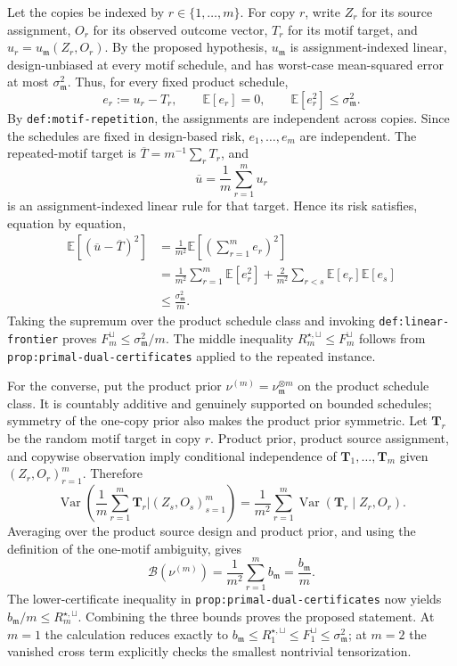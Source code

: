 Let the copies be indexed by \(r\in\{1,\ldots,m\}\).  For copy \(r\), write \(Z_r\) for its source assignment, \(O_r\) for its observed outcome vector, \(T_r\) for its motif target, and \(u_r=u_{\mathfrak m}(Z_r,O_r)\).  By the proposed hypothesis, \(u_{\mathfrak m}\) is assignment-indexed linear, design-unbiased at every motif schedule, and has worst-case mean-squared error at most \(\sigma_{\mathfrak m}^2\).  Thus, for every fixed product schedule,
\[
 e_r:=u_r-T_r,
 \qquad
 \mathbb E[e_r]=0,
 \qquad
 \mathbb E[e_r^2]\le\sigma_{\mathfrak m}^2.
\]
By \texttt{def:motif-repetition}, the assignments are independent across copies.  Since the schedules are fixed in design-based risk, \(e_1,\ldots,e_m\) are independent.  The repeated-motif target is \(\overline T=m^{-1}\sum_rT_r\), and
\[
 \overline u=\frac1m\sum_{r=1}^mu_r
\]
is an assignment-indexed linear rule for that target.  Hence its risk satisfies, equation by equation,
\[
\begin{aligned}
 \mathbb E[(\overline u-\overline T)^2]
 &=\frac1{m^2}\mathbb E\left[\left(\sum_{r=1}^me_r\right)^2\right]\\
 &=\frac1{m^2}\sum_{r=1}^m\mathbb E[e_r^2]
   +\frac2{m^2}\sum_{r<s}\mathbb E[e_r]\mathbb E[e_s]\\
 &\le\frac{\sigma_{\mathfrak m}^2}{m}.
\end{aligned}
\]
Taking the supremum over the product schedule class and invoking \texttt{def:linear-frontier} proves \(F_m^{\sqcup}\le\sigma_{\mathfrak m}^2/m\).  The middle inequality \(R_m^{\star,\sqcup}\le F_m^{\sqcup}\) follows from \texttt{prop:primal-dual-certificates} applied to the repeated instance.

For the converse, put the product prior \(\nu^{(m)}=\nu_{\mathfrak m}^{\otimes m}\) on the product schedule class.  It is countably additive and genuinely supported on bounded schedules; symmetry of the one-copy prior also makes the product prior symmetric.  Let \(\mathbf T_r\) be the random motif target in copy \(r\).  Product prior, product source assignment, and copywise observation imply conditional independence of \(\mathbf T_1,\ldots,\mathbf T_m\) given \((Z_r,O_r)_{r=1}^m\).  Therefore
\[
 \operatorname{Var}\!\left(
 \frac1m\sum_{r=1}^m\mathbf T_r
 \mathrel{\Big|}(Z_s,O_s)_{s=1}^m\right)
 =\frac1{m^2}\sum_{r=1}^m
 \operatorname{Var}(\mathbf T_r\mid Z_r,O_r).
\]
Averaging over the product source design and product prior, and using the definition of the one-motif ambiguity, gives
\[
 \mathcal B(\nu^{(m)})
 =\frac1{m^2}\sum_{r=1}^mb_{\mathfrak m}
 =\frac{b_{\mathfrak m}}m.
\]
The lower-certificate inequality in \texttt{prop:primal-dual-certificates} now yields \(b_{\mathfrak m}/m\le R_m^{\star,\sqcup}\).  Combining the three bounds proves the proposed statement.  At \(m=1\) the calculation reduces exactly to \(b_{\mathfrak m}\le R_1^{\star,\sqcup}\le F_1^{\sqcup}\le\sigma_{\mathfrak m}^2\); at \(m=2\) the vanished cross term explicitly checks the smallest nontrivial tensorization.